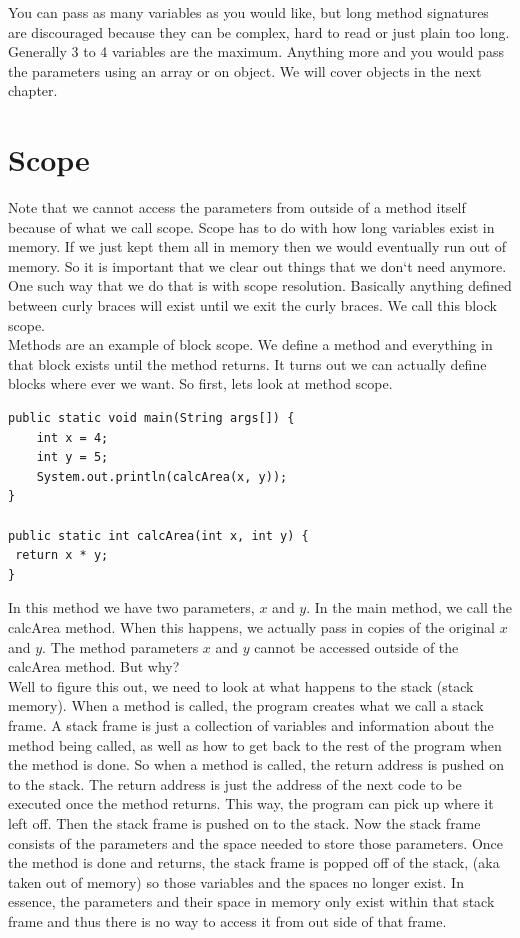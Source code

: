 \documentclass[11]{article}
\begin{document}
You can pass as many variables as you would like, but long method signatures are discouraged because they can be complex, hard to read or just plain too long. Generally 3 to 4 variables are the maximum. Anything more and you would pass the parameters using an array or on object. We will cover objects in the next chapter. \\

\section{Scope}
Note that we cannot access the parameters from outside of a method itself because of what we call scope. Scope has to do with how long variables exist in memory. If we just kept them all in memory then we would eventually run out of memory. So it is important that we clear out things that we don`t need anymore. One such way that we do that is with scope resolution. Basically anything defined between curly braces will exist until we exit the curly braces. We call this block scope.\\

Methods are an example of block scope. We define a method and everything in that block exists until the method returns. It turns out we can actually define blocks where ever we want. So first, lets look at method scope.

\begin{lstlisting}
public static void main(String args[]) {
	int x = 4;
	int y = 5;
	System.out.println(calcArea(x, y));
}

public static int calcArea(int x, int y) {
 return x * y;
}
\end{lstlisting}

In this method we have two parameters, $x$ and $y$. In the main method, we call the calcArea method. When this happens, we actually pass in copies of the original $x$ and $y$. The method parameters $x$ and $y$ cannot be accessed outside of the calcArea method. But why?\\

Well to figure this out, we need to look at what happens to the stack (stack memory). When a method is called, the program creates what we call a stack frame. A stack frame is just a collection of variables and information about the method being called, as well as how to get back to the rest of the program when the method is done. So when a method is called, the return address is pushed on to the stack. The return address is just the address of the next code to be executed once the method returns. This way, the program can pick up where it left off. Then the stack frame is pushed on to the stack. Now the stack frame consists of the parameters and the space needed to store those parameters. Once the method is done and returns, the stack frame is popped off of the stack, (aka taken out of memory) so those variables and the spaces no longer exist. In essence, the parameters and their space in memory only exist within that stack frame and thus there is no way to access it from out side of that frame.\\
\end{document}
